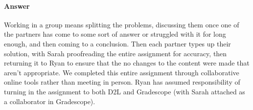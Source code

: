 \documentclass{article}
\begin{document}
\paragraph{Answer}{Working in a group means splitting the problems, discussing them once one of the partners has come to some sort of answer or struggled with it for long enough, and then coming to a conclusion. Then each partner types up their solution, with Sarah proofreading the entire assignment for accuracy, then returning it to Ryan to ensure that the no changes to the content were made that aren't appropriate. We completed this entire assignment through collaborative online tools rather than meeting in person. Ryan has assumed responsibility of turning in the assignment to both D2L and Gradescope (with Sarah attached as a collaborator in Gradescope).}

\end{document}
